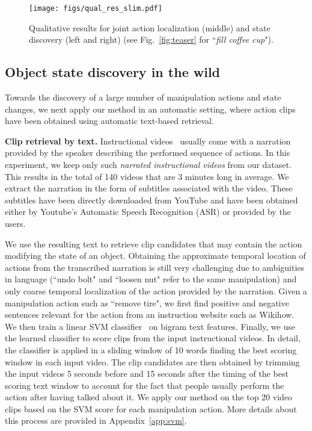 \begin{figure}
	\raggedleft    
	\texttt{[image: figs/qual\_res\_slim.pdf]}
	\caption{\small Qualitative results for joint action localization (middle) and state discovery (left and right) (see Fig.~\ref{fig:teaser} for ``\textit{fill coffee cup}").}
	\vspace*{-.5cm}
	\label{fig:qualres}
\end{figure}

\subsection{Object state discovery in the wild}
\label{sec:exp_weak}
Towards the discovery of a large number of manipulation actions and state changes, we next apply our method in an automatic setting, where action clips have been obtained using automatic text-based retrieval.
%
%
%

%
 
%
%
%
%
%

\noindent\textbf{Clip retrieval by text.}
Instructional videos~\cite{Alayrac15Unsupervised,Malmaud15what,Sener15unsupervised} usually come with a narration provided by the speaker describing the performed sequence of actions. In this experiment, we keep only such {\em narrated instructional videos} from our dataset. This results in the total of 140 videos that are 3 minutes long in average. 
We extract the narration in the form of subtitles associated with the video. 
These subtitles have been directly downloaded from YouTube and have been obtained either by Youtube's Automatic Speech Recognition (ASR) or provided by the users.%

We use the resulting text to retrieve clip candidates that may contain the action modifying the state of an object. 
Obtaining the approximate temporal location of actions from the transcribed narration is still very challenging due to ambiguities in language (``undo bolt" and ``loosen nut" refer to the same manipulation) and only coarse temporal localization of the action provided by the narration. %
%
%
Given a manipulation action such as ``remove tire", we first find positive and negative sentences relevant for the action from an instruction website such as Wikihow.
We then train a linear SVM classifier~\cite{cortes95SVM} on bigram text features. 
Finally, we use the learned classifier to score clips from the input instructional videos.
In detail, the classifier is applied in a sliding window of 10 words finding the best scoring window in each input video. The clip candidates are then obtained by trimming the input videos 5 seconds before and 15 seconds after the timing of the best scoring text window to account for the fact that people usually perform the action after having talked about it.
We apply our method on the top 20 video clips based on the SVM score for each manipulation action.
More details about this process are provided in Appendix~\ref{app:svm}.
%
%
%
%

